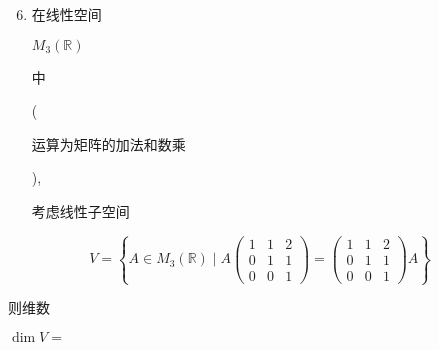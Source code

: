 \documentclass[10pt]{article}
\begin{document}
\begin{enumerate}
  \setcounter{enumi}{5}
  \item \begin{CJK}{UTF8}{mj}在线性空间\end{CJK} $M_{3}(\mathbb{R})$ \begin{CJK}{UTF8}{mj}中\end{CJK}(\begin{CJK}{UTF8}{mj}运算为矩阵的加法和数乘\end{CJK}), \begin{CJK}{UTF8}{mj}考虑线性子空间\end{CJK}
\end{enumerate}
$$
V=\left\{A \in M_{3}(\mathbb{R}) \mid A\left(\begin{array}{lll}
1 & 1 & 2 \\
0 & 1 & 1 \\
0 & 0 & 1
\end{array}\right)=\left(\begin{array}{lll}
1 & 1 & 2 \\
0 & 1 & 1 \\
0 & 0 & 1
\end{array}\right) A\right\}
$$
\begin{CJK}{UTF8}{mj}则维数\end{CJK} $\operatorname{dim} V=$
\end{document}
